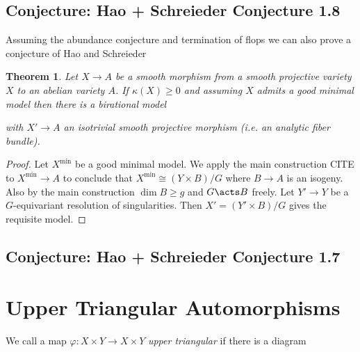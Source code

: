\documentclass[12pt]{article}
\theoremstyle{plain}
\newtheorem{Lthm}{Theorem}
\begin{document}
\subsection{Conjecture: Hao + Schreieder Conjecture 1.8}

Assuming the abundance conjecture and termination of flops we can also prove a conjecture of Hao and Schreieder \cite[HS21(1)]{Conjecture 1.8}

\begin{Lthm}\label{thm:smooth_map_to_simpleAV}
Let $X \to A$ be a smooth morphism from a smooth projective variety $X$ to an abelian variety $A$. If $\kappa(X) \ge 0$ and assuming $X$ admits a good minimal model then there is a birational model
\begin{center}
\end{center}
with $X' \to A$ an isotrivial smooth projective morphism (i.e. an analytic fiber bundle).
\end{Lthm}

\begin{proof}
Let $X^{\min}$ be a good minimal model.
We apply the main construction {\color{red} CITE} to $X^{\min} \to A$ to conclude that $X^{\min} \cong (Y \times B)/G$ where $B \to A$ is an isogeny. Also by the main construction $\dim{B} \ge g$ and $G \acts B$ freely. Let $Y' \to Y$ be a $G$-equivariant resolution of singularities. Then $X' = (Y' \times B)/G$ gives the requisite model.
\end{proof}


\subsection{Conjecture: Hao + Schreieder Conjecture 1.7}

\section{Upper Triangular Automorphisms}

We call a map $\varphi : X \times Y \to X \times Y$ \textit{upper triangular} if there is a diagram
\begin{center}
\end{center}
\end{document}
